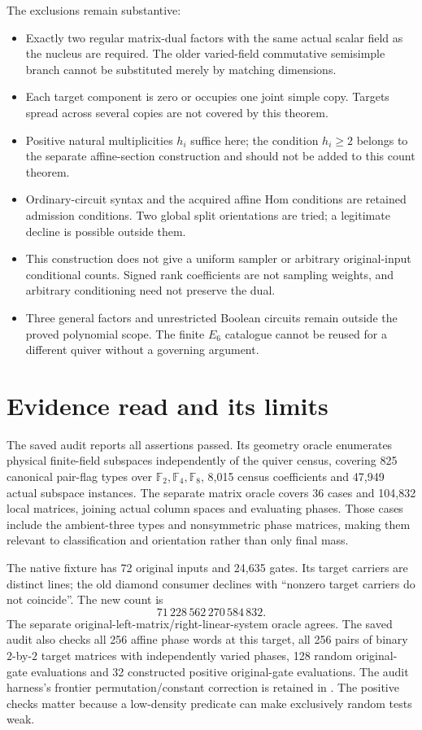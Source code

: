 \documentclass[11pt]{article}
\newcommand{\F}{\mathbb F}
\begin{document}
The exclusions remain substantive:
\begin{itemize}
\item Exactly two regular matrix-dual factors with the same actual scalar
field as the nucleus are required. The older varied-field commutative
semisimple branch cannot be substituted merely by matching dimensions.
\item Each target component is zero or occupies one joint simple copy.
Targets spread across several copies are not covered by this theorem.
\item Positive natural multiplicities $h_i$ suffice here; the condition
$h_i\ge2$ belongs to the separate affine-section construction and should
not be added to this count theorem.
\item Ordinary-circuit syntax and the acquired affine Hom conditions are
retained admission conditions. Two global split orientations are tried;
a legitimate decline is possible outside them.
\item This construction does not give a uniform sampler or arbitrary
original-input conditional counts. Signed rank coefficients are not
sampling weights, and arbitrary conditioning need not preserve the dual.
\item Three general factors and unrestricted Boolean circuits remain
outside the proved polynomial scope. The finite $E_6$ catalogue cannot
be reused for a different quiver without a governing argument.
\end{itemize}

\section{Evidence read and its limits}
The saved audit reports all assertions passed. Its geometry oracle
enumerates physical finite-field subspaces independently of the quiver
census, covering 825 canonical pair-flag types over $\F_2,\F_4,\F_8$,
8,015 census coefficients and 47,949 actual subspace instances.
The separate matrix oracle covers 36 cases and 104,832 local matrices,
joining actual column spaces and evaluating phases. Those cases include
the ambient-three types and nonsymmetric phase matrices, making them
relevant to classification and orientation rather than only final mass.

The native fixture has 72 original inputs and 24,635 gates. Its target
carriers are distinct lines; the old diamond consumer declines with
``nonzero target carriers do not coincide''. The new count is
\[
 71\,228\,562\,270\,584\,832.
\]
The separate original-left-matrix/right-linear-system oracle agrees.
The saved audit also checks all 256 affine phase words at this target,
all 256 pairs of binary $2$-by-$2$ target matrices with independently
varied phases, 128 random original-gate evaluations and 32 constructed
positive original-gate evaluations. The audit harness's frontier
permutation/constant correction is retained in
. The positive
checks matter because a low-density predicate can make exclusively
random tests weak.
\end{document}
